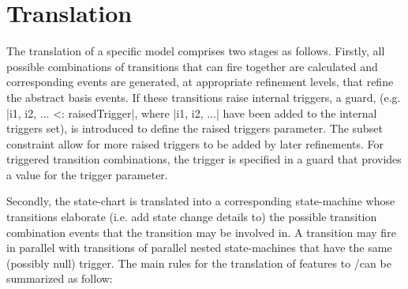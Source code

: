 
\section{\SCXML Translation}
\label{sec:translation}
The translation of a specific \SCXML model comprises two stages as follows. 
Firstly, all possible combinations of transitions that can fire together are calculated and corresponding events are generated, at appropriate refinement levels, that refine the abstract basis events.  
If these transitions raise internal triggers, a guard, (e.g. |{i1, i2, ...} <: raisedTrigger|, where |i1, i2, ...| have been added to the internal triggers set), is introduced to define the raised triggers parameter. 
The subset constraint allow for more raised triggers to be added by later refinements.
For triggered transition combinations, the trigger is specified in a guard that provides a value for the trigger parameter. 


Secondly, the \SCXML state-chart is translated into a corresponding \UMLB state-machine whose transitions elaborate (i.e. add state change details to) the possible transition combination events that the transition may be involved in. 
A transition may fire in parallel with transitions of parallel nested state-machines that have the same (possibly null) trigger.
The main rules for the translation of \SCXML features to \UMLB/\EVENTB can be summarized as follow:

